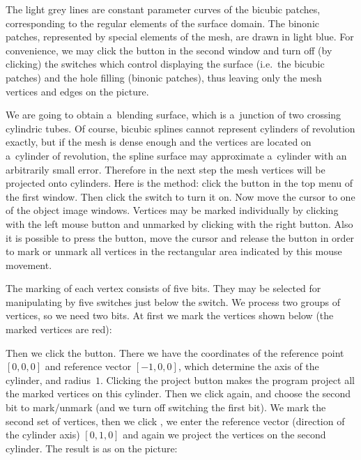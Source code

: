 The light grey lines are constant parameter curves of the bicubic patches,
corresponding to the regular elements of the surface domain. The binonic
patches, represented by special elements of the mesh, are drawn in light
blue. For convenience, we may click the  button in the second
window and turn off (by clicking) the switches which control displaying the
surface (i.e.\ the bicubic patches) and the hole filling (binonic patches),
thus leaving only the mesh vertices and edges on the picture.

We are going to obtain a~blending surface, which is a~junction of two
crossing cylindric tubes. Of course, bicubic splines cannot represent
cylinders of revolution exactly, but if the mesh is dense enough and the
vertices are located on a~cylinder of revolution, the spline surface may
approximate a~cylinder with an arbitrarily small error. Therefore in the
next step the mesh vertices will be projected onto cylinders. Here is the
method: click the  button in the top menu of the first window.
Then click the  switch to turn it on. Now move the
cursor to one of the object image windows. Vertices may be marked
individually by clicking with the left mouse button and unmarked by clicking
with the right button. Also it is possible to press the button, move the
cursor and release the button in order to mark or unmark all vertices in the
rectangular area indicated by this mouse movement.

The marking of each vertex consists of five bits. They may be selected for
manipulating by five switches just below the  switch.
We process two groups of vertices, so we need two bits. At first we mark the
vertices shown below (the marked vertices are red):


\newpage
Then we click the  button. There we have the coordinates
of the reference point $[0,0,0]$ and reference vector $[-1,0,0]$, which
determine the axis of the cylinder, and radius~$1$. Clicking the project
 button makes the program project all the marked
vertices on this cylinder. Then we click  again, and choose the
second bit to mark/unmark (and we turn off switching the first bit). We mark
the second set of vertices, then we click , we enter
the reference vector (direction of the cylinder axis) $[0,1,0]$ and again we
project the vertices on the second cylinder. The result is as on the picture:

